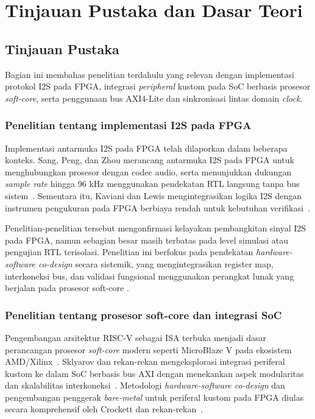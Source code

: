 \chapter{Tinjauan Pustaka dan Dasar Teori}

\section{Tinjauan Pustaka}

Bagian ini membahas penelitian terdahulu yang relevan dengan implementasi protokol I2S pada FPGA, integrasi \textit{peripheral} kustom pada SoC berbasis prosesor \textit{soft-core}, serta penggunaan bus AXI4-Lite dan sinkronisasi lintas domain \textit{clock}.

\subsection{Penelitian tentang implementasi I2S pada FPGA}

Implementasi antarmuka I2S pada FPGA telah dilaporkan dalam beberapa konteks. Sang, Peng, dan Zhou merancang antarmuka I2S pada FPGA untuk menghubungkan prosesor dengan codec audio, serta menunjukkan dukungan \textit{sample rate} hingga 96 kHz menggunakan pendekatan RTL langsung tanpa bus sistem~\citep{sang_i2s_codec_2020}. Sementara itu, Kaviani dan Lewis mengintegrasikan logika I2S dengan instrumen pengukuran pada FPGA berbiaya rendah untuk kebutuhan verifikasi~\citep{kaviani_i2s_fpga_2017}.

Penelitian-penelitian tersebut mengonfirmasi kelayakan pembangkitan sinyal I2S pada FPGA, namun sebagian besar masih terbatas pada level simulasi atau pengujian RTL terisolasi. Penelitian ini berfokus pada pendekatan \textit{hardware-software co-design} secara sistemik, yang mengintegrasikan register map, interkoneksi bus, dan validasi fungsional menggunakan perangkat lunak yang berjalan pada prosesor soft-core \citep{lafosse_embedded_2018}.

\subsection{Penelitian tentang prosesor soft-core dan integrasi SoC}

Pengembangan arsitektur RISC-V sebagai ISA terbuka menjadi dasar perancangan prosesor \textit{soft-core} modern seperti MicroBlaze V pada ekosistem AMD/Xilinx~\citep{waterman_riscv_2016,xilinx_microblaze_ref_2021}. Sklyarov dan rekan-rekan mengeksplorasi integrasi periferal kustom ke dalam SoC berbasis bus AXI dengan menekankan aspek modularitas dan skalabilitas interkoneksi~\citep{sklyarov_axi_peripheral_2014}. Metodologi \textit{hardware-software co-design} dan pengembangan penggerak \textit{bare-metal} untuk periferal kustom pada FPGA diulas secara komprehensif oleh Crockett dan rekan-rekan~\citep{crockett_zynq_book_2014}.

